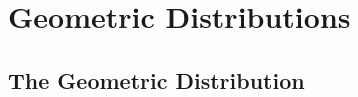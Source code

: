 \documentclass[../alevelmaths.tex]{subfiles}
\begin{document}
\chapter{Geometric Distributions}
\section{The Geometric Distribution}
\end{document}
